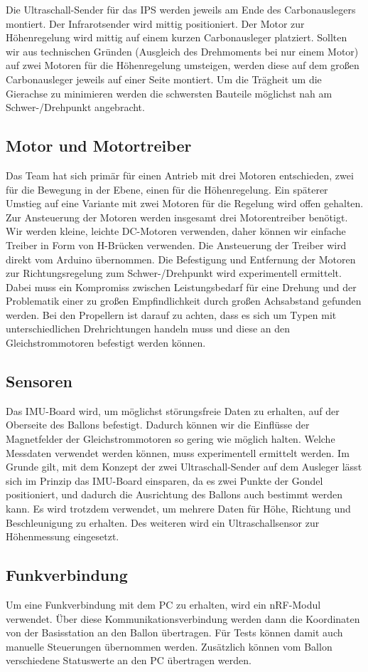 \documentclass[lang=ngerman,inputenc=utf8,fontsize=10pt]{ldvarticle}
\begin{document}
Die Ultraschall-Sender für das IPS werden jeweils am Ende des Carbonauslegers montiert. Der Infrarotsender wird mittig positioniert. Der Motor zur Höhenregelung wird mittig auf einem kurzen Carbonausleger platziert. Sollten wir aus technischen Gründen (Ausgleich des Drehmoments bei nur einem Motor) auf zwei Motoren für die Höhenregelung umsteigen, werden diese auf dem großen Carbonausleger jeweils auf einer Seite montiert. Um die Trägheit um die Gierachse zu minimieren werden die schwersten Bauteile möglichst nah am Schwer-/Drehpunkt angebracht.
\subsection*{Motor und Motortreiber}
Das Team hat sich primär für einen Antrieb mit drei Motoren entschieden, zwei für die Bewegung in der Ebene, einen für die Höhenregelung. Ein späterer Umstieg auf eine Variante mit zwei Motoren für die Regelung wird offen gehalten. Zur Ansteuerung der Motoren werden insgesamt drei Motorentreiber benötigt. Wir werden kleine, leichte DC-Motoren verwenden, daher können wir einfache Treiber in Form von H-Brücken verwenden. Die Ansteuerung der Treiber wird direkt vom Arduino übernommen. Die Befestigung und Entfernung der Motoren zur Richtungsregelung zum Schwer-/Drehpunkt wird experimentell ermittelt. Dabei muss ein Kompromiss zwischen Leistungsbedarf für eine Drehung und der Problematik einer zu großen Empfindlichkeit durch großen Achsabstand gefunden werden. Bei den Propellern ist darauf zu achten, dass es sich um Typen mit unterschiedlichen Drehrichtungen handeln muss und diese an den Gleichstrommotoren befestigt werden können.
\subsection*{Sensoren}
Das IMU-Board wird, um möglichst störungsfreie Daten zu erhalten, auf der Oberseite des Ballons befestigt. Dadurch können wir die Einflüsse der Magnetfelder der Gleichstrommotoren so gering wie möglich halten. Welche Messdaten verwendet werden können, muss experimentell ermittelt werden. Im Grunde gilt, mit dem Konzept der zwei Ultraschall-Sender auf dem Ausleger lässt sich im Prinzip das IMU-Board einsparen, da es zwei Punkte der Gondel positioniert, und dadurch die Ausrichtung des Ballons auch bestimmt werden kann. Es wird trotzdem verwendet, um mehrere Daten für Höhe, Richtung und Beschleunigung zu erhalten. Des weiteren wird ein Ultraschallsensor zur Höhenmessung eingesetzt.
\subsection*{Funkverbindung}
Um eine Funkverbindung mit dem PC zu erhalten, wird ein nRF-Modul verwendet. Über diese Kommunikationsverbindung werden dann die Koordinaten von der Basisstation an den Ballon übertragen. Für Tests können damit auch manuelle Steuerungen übernommen werden. Zusätzlich können vom Ballon verschiedene Statuswerte an den PC übertragen werden.
\end{document}
